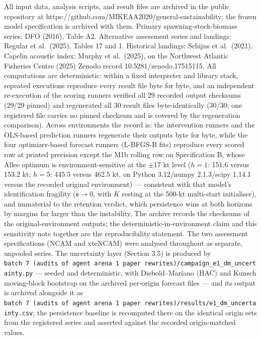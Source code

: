 \documentclass[11pt]{article}
\begin{document}
All input data, analysis scripts, and result files are archived in the
public repository at
https://github.com/MIKEAA2020/general-sustainability; the frozen model
specification is archived with them. Primary spawning-stock-biomass
series: DFO (2016), Table A2. Alternative assessment series and
landings: Regular et al.~(2025), Tables 17 and 1. Historical landings:
Schijns et al.~(2021). Capelin acoustic index: Murphy et al.~(2025), on
the Northwest Atlantic Fisheries Centre (2025) Zenodo record
10.5281/zenodo.17515115. All computations are deterministic: within a
fixed interpreter and library stack, repeated executions reproduce every
result file byte for byte, and an independent re-execution of the
scoring runners verified all 29 recorded output checksums (29/29 pinned)
and regenerated all 30 result files byte-identically (30/30; one
registered file carries no pinned checksum and is covered by the
regeneration comparison). Across environments the record is: the
intervention runners and the OLS-based prediction runners regenerate
their outputs byte for byte, while the four optimizer-based forecast
runners (L-BFGS-B fits) reproduce every scored row at printed precision
except the M1b rolling row on Specification B, whose Allee optimum is
environment-sensitive at the \ensuremath{\pm}17 kt level (\(h=1\): 151.6 versus 153.2
kt; \(h=5\): 445.5 versus 462.5 kt, on Python 3.12/numpy 2.1.3/scipy
1.14.1 versus the recorded original environment) --- consistent with
that model's identification fragility (\(\mathfrak s\to 0\), with
\(K\) resting at the 500-kt multi-start initialiser), and immaterial to the retention verdict, which
persistence wins at both horizons by margins far larger than the
instability. The archive records the checksums of the
original-environment outputs; the deterministic-in-environment claim and
this sensitivity note together are the reproducibility statement. The
two assessment specifications (NCAM and xteNCAM) were analysed
throughout as separate, unpooled series. The uncertainty
layer (Section 3.5) is produced by
\texttt{batch\ 7\ (audits\ of\ agent\ arena\ 1\ paper\ rewrites)/campaign\_e1\_dm\_uncertainty.py}
--- seeded and deterministic, with Diebold--Mariano (HAC) and Kunsch
moving-block bootstrap on the archived per-origin forecast files --- and
its output is archived alongside it as
\texttt{batch\ 7\ (audits\ of\ agent\ arena\ 1\ paper\ rewrites)/results/e1\_dm\_uncertainty.csv};
the persistence baseline is recomputed there on the identical origin
sets from the registered series and asserted against the recorded
origin-matched values.
\end{document}
